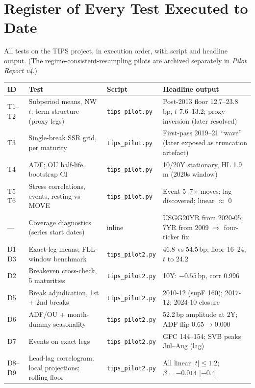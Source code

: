 \documentclass[11pt]{article}
\begin{document}
\section{Register of Every Test Executed to Date}

All tests on the TIPS project, in execution order, with script and headline output. (The regime-consistent-resampling pilots are archived separately in \emph{Pilot Report v4}.)

\begin{table}[h!]
\centering\footnotesize
\setlength{\tabcolsep}{3.5pt}\begin{tabular}{p{0.8cm}p{5.4cm}p{3.2cm}p{4.5cm}}
\toprule
ID & Test & Script & Headline output \\
\midrule
T1--T2 & Subperiod means, NW $t$; term structure (proxy legs) & \texttt{tips\_pilot.py} & Post-2013 floor 12.7--23.8\,bp, $t$ 7.6--13.2; proxy inversion (later resolved) \\
T3 & Single-break SSR grid, per maturity & \texttt{tips\_pilot.py} & First-pass 2019--21 ``wave'' (later exposed as truncation artefact) \\
T4 & ADF; OU half-life, bootstrap CI & \texttt{tips\_pilot.py} & 10/20Y stationary, HL 1.9\,m (2020s window) \\
T5--T6 & Stress correlations, events, resting-vs-MOVE & \texttt{tips\_pilot.py} & Event 5--7$\times$ moves; lag discovered; linear $\approx$ 0 \\
--- & Coverage diagnostics (series start dates) & inline & USGG20YR from 2020-05; 7YR from 2009 $\Rightarrow$ four-ticker fix \\
D1--D3 & Exact-leg means; FLL-window benchmark & \texttt{tips\_pilot2.py} & 46.8 vs 54.5\,bp; floor 16--24, $t$ to 24.2 \\
D2 & Breakeven cross-check, 5 maturities & \texttt{tips\_pilot2.py} & 10Y: $-0.55$\,bp, corr 0.996 \\
D5 & Break adjudication, 1st + 2nd breaks & \texttt{tips\_pilot2.py} & 2010-12 (supF 160); 2017-12; 2024-10 closure \\
D6 & ADF/OU + month-dummy seasonality & \texttt{tips\_pilot2.py} & 52.2\,bp amplitude at 2Y; ADF flip 0.65$\to$0.000 \\
D7 & Events on exact legs & \texttt{tips\_pilot2.py} & GFC 144--154; SVB peaks Jul--Aug (lag) \\
D8--D9 & Lead-lag correlogram; local projections; rolling floor & \texttt{tips\_pilot2.py} & All linear $|t|\le1.2$; $\beta=-0.014$ [$-0.4$] \\

\end{tabular}
\end{table}
\end{document}
